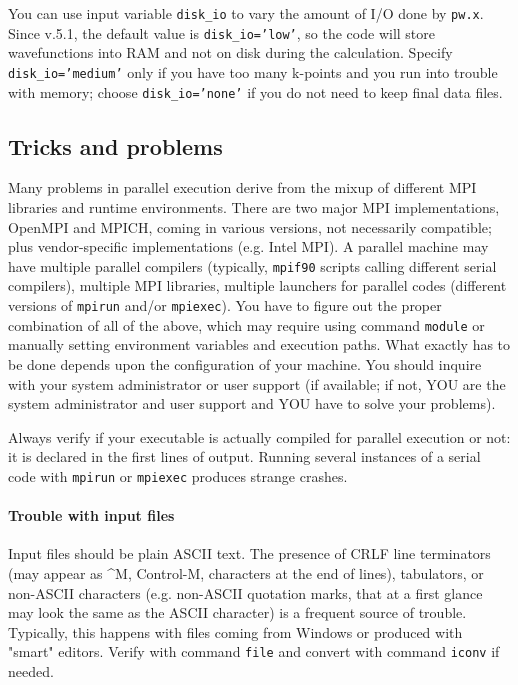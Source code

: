 \documentclass[12pt,a4paper]{article}
\def\pwx{\texttt{pw.x}}
\def\cpx{\texttt{cp.x}}
\begin{document}
You can use input variable \texttt{disk\_io} to vary the
amount of I/O done by \pwx. Since v.5.1, the default value is
\texttt{disk\_io='low'}, so the code will store wavefunctions
into RAM and not on disk during the calculation. Specify
\texttt{disk\_io='medium'} only if you have too many k-points
and you run into trouble with memory; choose \texttt{disk\_io='none'}
if you do not need to keep final data files.


\subsection{Tricks and problems}
\label{SubSec:badpara}

Many problems in parallel execution derive from the mixup of different
MPI libraries and runtime environments. There are two major MPI
implementations, OpenMPI and MPICH, coming in various versions,
not necessarily compatible; plus vendor-specific implementations
(e.g. Intel MPI). A parallel machine may have multiple parallel
compilers (typically, \texttt{mpif90} scripts calling different
serial compilers), multiple MPI libraries, multiple launchers
for parallel codes (different versions of \texttt{mpirun} and/or
\texttt{mpiexec}). You have to figure out the proper combination
of all of the above, which may require using command \texttt{module}
or manually setting environment variables and execution paths.
What exactly has to be done depends upon the configuration of your
machine. You should inquire with your system administrator or user
support (if available; if not, YOU are the system administrator
and user support and YOU have to solve your problems).

Always verify if your executable is actually compiled for
parallel execution or not: it is declared in the first lines
of output. Running several instances of a serial code with
\texttt{mpirun} or \texttt{mpiexec} produces strange crashes.

\paragraph{Trouble with input files}
Input files should be plain ASCII text. The presence of CRLF line 
terminators (may appear as \^{}M, Control-M, characters at the end
of lines), tabulators, or non-ASCII characters (e.g. non-ASCII
quotation marks, that at a first glance may look the same as
the ASCII character) is a frequent source of trouble.
Typically, this happens with files coming from Windows or produced
with "smart" editors. Verify with command \texttt{file} and convert
with command \texttt{iconv} if needed.
\end{document}
